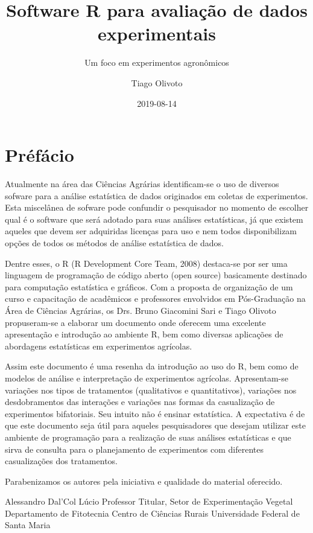 \documentclass[]{book}
\title{Software R para avaliação de dados experimentais}
\subtitle{Um foco em experimentos agronômicos}
\author{Tiago Olivoto}
\date{2019-08-14}
\begin{document}
\maketitle

{
\setcounter{tocdepth}{1}
\tableofcontents
}
\hypertarget{prefacio}{%
\chapter*{Préfácio}\label{prefacio}}

Atualmente na área das Ciências Agrárias identificam-se o uso de diversos sofware para a análise estatística de dados originados em coletas de experimentos. Esta miscelânea de sofware pode confundir o pesquisador no momento de escolher qual é o software que será adotado para suas análises estatísticas, já que existem aqueles que devem ser adquiridas licenças para uso e nem todos disponibilizam opções de todos os métodos de análise estatística de dados.

Dentre esses, o R (R Development Core Team, 2008) destaca-se por ser uma
linguagem de programação de código aberto (open source) basicamente destinado para computação estatística e gráficos. Com a proposta de organização de um curso e capacitação de acadêmicos e professores envolvidos em Pós-Graduação na Área de Ciências Agrárias, os Drs. Bruno Giacomini Sari e Tiago Olivoto propuseram-se a elaborar um documento onde oferecem uma excelente apresentação e introdução ao ambiente R, bem como diversas aplicações de abordagens estatísticas em experimentos agrícolas.

Assim este documento é uma resenha da introdução ao uso do R, bem como de modelos de análise e interpretação de experimentos agrícolas. Apresentam-se variações nos tipos de tratamentos (qualitativos e quantitativos), variações nos desdobramentos das interações e variações nas formas da casualização de experimentos bifatoriais. Seu intuito não é ensinar estatística. A expectativa é de que este documento seja útil para aqueles pesquisadores que desejam utilizar este ambiente de programação para a realização de suas análises estatísticas e que sirva de consulta para o planejamento de experimentos com diferentes casualizações dos tratamentos.

Parabenizamos os autores pela iniciativa e qualidade do material oferecido.

Alessandro Dal'Col Lúcio
Professor Titular, Setor de Experimentação Vegetal
Departamento de Fitotecnia
Centro de Ciências Rurais
Universidade Federal de Santa Maria
\end{document}
